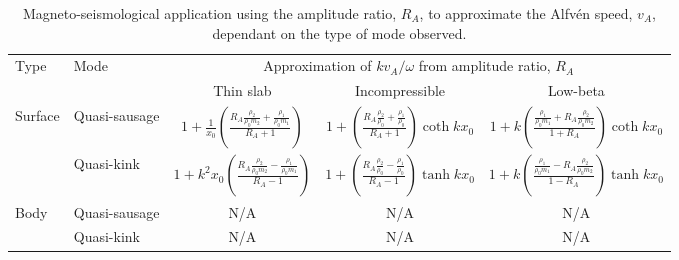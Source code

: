 \documentclass[namedreferences]{solarphysics}
\numberwithin{equation}{section}
\begin{document}
\begin{article}
\begin{landscape}


\begin{table}
\caption{Magneto-seismological application using the amplitude ratio, $R_A$, to approximate the Alfv\'{e}n speed, $v_A$, dependant on the type of mode observed.}
\label{table label}
\begin{tabular}{llccc}
  \toprule
Type & Mode & \multicolumn{3}{c}{Approximation of $kv_A / \omega$ from amplitude ratio, $R_A$} \\
\cmidrule(lr){3-5}
	 &	    & \multicolumn{1}{c}{Thin slab} & \multicolumn{1}{c}{Incompressible} & \multicolumn{1}{c}{Low-beta} \\
  \midrule
\multirow{2}{*}{Surface} & Quasi-sausage & $ 1 + \frac{1}{x_0}\left(\frac{R_A\frac{\rho_2}{\rho_0m_2} + \frac{\rho_1}{\rho_0m_1}}{R_A + 1}\right) $ & $ 1 + \left( \frac{R_A \frac{\rho_2}{\rho_0} + \frac{\rho_1}{\rho_0}}{R_A + 1} \right) \coth{kx_0} $ & $ 1 + k \left( \frac{ \frac{\rho_1}{\rho_0m_1} + R_A\frac{\rho_2}{\rho_0m_2}}{1 + R_A} \right) \coth{kx_0} $ \\
						   & Quasi-kink	   & $ 1 + k^2x_0\left(\frac{R_A\frac{\rho_2}{\rho_0m_2} - \frac{\rho_1}{\rho_0m_1}}{R_A - 1}\right) $ & $ 1 + \left( \frac{R_A \frac{\rho_2}{\rho_0} - \frac{\rho_1}{\rho_0}}{R_A - 1} \right) \tanh{kx_0} $ & $ 1 + k \left( \frac{ \frac{\rho_1}{\rho_0m_1} - R_A\frac{\rho_2}{\rho_0m_2}}{1 - R_A} \right) \tanh{kx_0} $ \\
\multirow{2}{*}{Body}    & Quasi-sausage & N/A & N/A & N/A \\
						   & Quasi-kink	   & N/A & N/A & N/A \\
  \bottomrule
\end{tabular}
\end{table}




\end{landscape}
\end{article}
\end{document}
